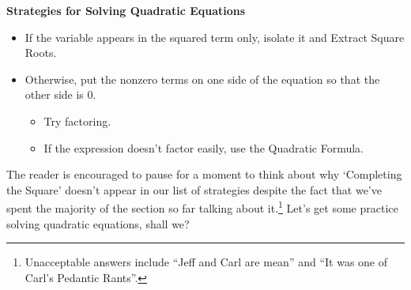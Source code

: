 \documentclass{ximera}
\begin{document}
\medskip

\label{solvequadraticeqns}

\centerline{\textbf{Strategies for Solving Quadratic Equations}}

\begin{itemize}

\item  If the variable appears in the squared term only, isolate it and Extract Square Roots.
\item  Otherwise, put the nonzero terms on one side of the equation so that the other side is $0$.
\begin{itemize}
\item  Try factoring.  
\item  If the expression doesn't factor easily, use the Quadratic Formula.

\end{itemize}
\end{itemize}


\medskip

The reader is encouraged to pause for a moment to think about why `Completing the Square' doesn't appear in our list of strategies despite the fact that we've spent the majority of the section so far talking about it.\footnote{Unacceptable answers include ``Jeff and Carl are mean'' and ``It was one of Carl's Pedantic Rants''.}  Let's get some practice solving quadratic equations, shall we?
\end{document}
